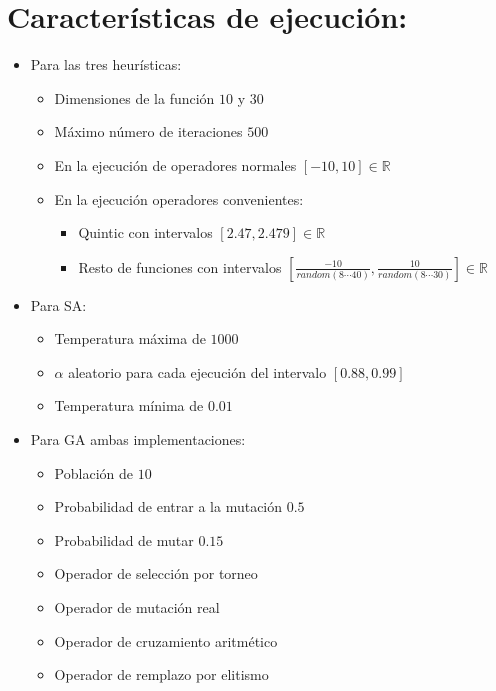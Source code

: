 \documentclass[10pt]{article}
\begin{document}
\section{Características de ejecución:}
\begin{itemize}
  \item Para las tres heurísticas:
  \begin{itemize}
    \item Dimensiones de la función $10$ y $30$
    \item Máximo número de iteraciones $500$
    \item En la ejecución de operadores normales $\left[-10,10\right]\in\mathbb{R}$
    \item En la ejecución operadores convenientes:
    \begin{itemize}
      \item Quintic con intervalos $\left[2.47,2.479\right]\in\mathbb{R}$
      \item Resto de funciones con intervalos \(\displaystyle\left[ \frac{-10}{random(8\cdots40)}, \frac{10}{random(8\cdots30)} \right]\in\mathbb{R}\)
    \end{itemize}
  \end{itemize}
  \item Para SA:
  \begin{itemize}
    \item Temperatura máxima de $1000$
    \item $\alpha$ aleatorio para cada ejecución del intervalo $[0.88,0.99]$
    \item Temperatura mínima de $0.01$
  \end{itemize}
  \item Para GA ambas implementaciones:
  \begin{itemize}
    \item Población de $10$
    \item Probabilidad de entrar a la mutación $0.5$
    \item Probabilidad de mutar $0.15$
    \item Operador de selección por torneo
    \item Operador de mutación real
    \item Operador de cruzamiento aritmético
    \item Operador de remplazo por elitismo
  \end{itemize}
\end{itemize}
\end{document}
